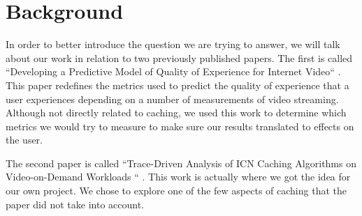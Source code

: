 \section{Background} \label{sec:background}
In order to better introduce the question we are trying to answer, we will talk
about our work in relation to two previously published papers. The first is
called ``Developing a Predictive Model of Quality of Experience for Internet
Video`` \cite{1}. This paper redefines the metrics used to predict the quality of
experience that a user experiences depending on a number of measurements of
video streaming. Although not directly related to caching, we used this work to
determine which metrics we would try to measure to make sure our results
translated to effects on the user.

The second paper is called ``Trace-Driven Analysis of ICN Caching Algorithms on
Video-on-Demand Workloads `` \cite{2}. This work is actually where we got the idea for
our own project. We chose to explore one of the few aspects of caching that the
paper did not take into account.
